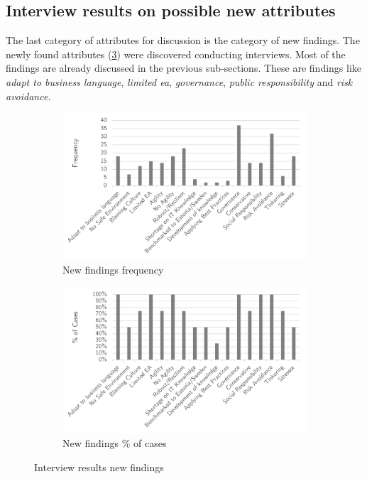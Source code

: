 \subsection{Interview results on possible new attributes}
\label{sub:interviewresultsnewattributes}
The last category of \glspl{attribute} for discussion is the category of new findings. The newly found \glspl{attribute} \mbox{(\cref{fig:interviewresultsfindings})} were discovered conducting interviews. Most of the findings are already discussed in the previous sub-sections. These are findings like \textit{adapt to business language}, \textit{limited \acrshort{ea}}, \textit{governance}, \textit{public responsibility} and \textit{risk avoidance}. 
\begin{figure}[H]
	\centering
	\begin{subfigure}[H]{0.5\textwidth}
		\centering
		\includegraphics[width=0.95\linewidth]{images/findings_frequency}
		\caption{New findings frequency}
		\label{fig:findingsfrequency}
	\end{subfigure}%
	\begin{subfigure}[H]{0.5\textwidth}
		\centering
		\includegraphics[width=0.95\linewidth]{images/findings_cases}
		\caption{New findings \% of cases}
		\label{fig:findingscases}
	\end{subfigure}
	\caption{Interview results new findings}
	\label{fig:interviewresultsfindings}
\end{figure}
